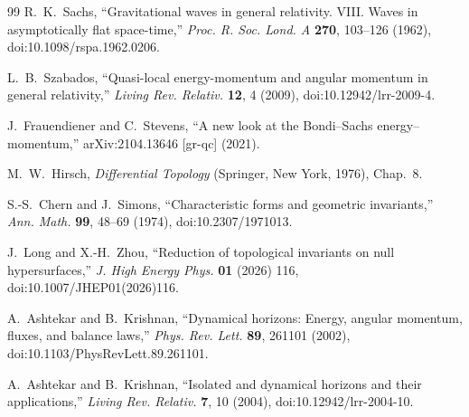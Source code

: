 \documentclass[aps,prd,reprint,nofootinbib,superscriptaddress]{revtex4-2}
\theoremstyle{definition}
\theoremstyle{remark}
\begin{document}
\begin{thebibliography}{99}
R.~K.~Sachs,
``Gravitational waves in general relativity. VIII. Waves in asymptotically flat space-time,''
\emph{Proc. R. Soc. Lond. A} \textbf{270}, 103--126 (1962),
doi:10.1098/rspa.1962.0206.

L.~B.~Szabados,
``Quasi-local energy-momentum and angular momentum in general relativity,''
\emph{Living Rev. Relativ.} \textbf{12}, 4 (2009),
doi:10.12942/lrr-2009-4.

J.~Frauendiener and C.~Stevens,
``A new look at the Bondi--Sachs energy--momentum,''
arXiv:2104.13646 [gr-qc] (2021).

M.~W.~Hirsch,
\emph{Differential Topology}
(Springer, New York, 1976), Chap.~8.

S.-S.~Chern and J.~Simons,
``Characteristic forms and geometric invariants,''
\emph{Ann. Math.} \textbf{99}, 48--69 (1974),
doi:10.2307/1971013.

J.~Long and X.-H.~Zhou,
``Reduction of topological invariants on null hypersurfaces,''
\emph{J. High Energy Phys.} \textbf{01} (2026) 116,
doi:10.1007/JHEP01(2026)116.

A.~Ashtekar and B.~Krishnan,
``Dynamical horizons: Energy, angular momentum, fluxes, and balance laws,''
\emph{Phys. Rev. Lett.} \textbf{89}, 261101 (2002),
doi:10.1103/PhysRevLett.89.261101.

A.~Ashtekar and B.~Krishnan,
``Isolated and dynamical horizons and their applications,''
\emph{Living Rev. Relativ.} \textbf{7}, 10 (2004),
doi:10.12942/lrr-2004-10.

\end{thebibliography}
\end{document}
